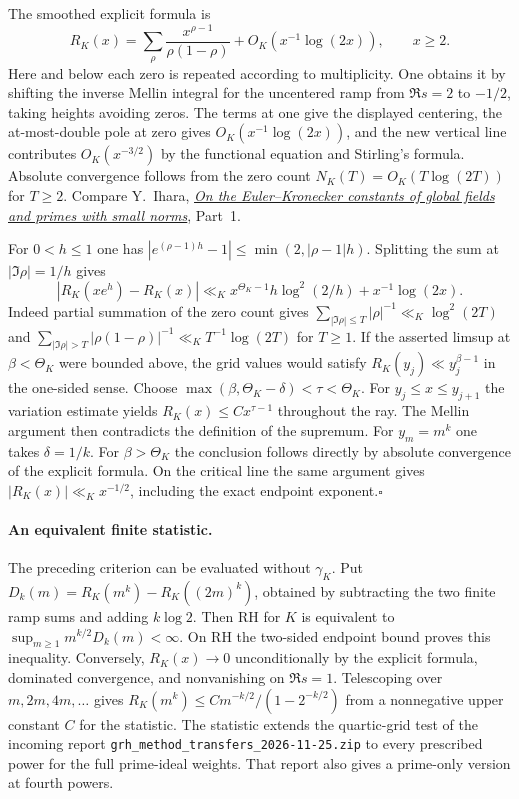 The smoothed explicit formula is
\[
 R_K(x)=\sum_\rho\frac{x^{\rho-1}}{\rho(1-\rho)}
             +O_K(x^{-1}\log(2x)),\qquad x\ge2 .
\]
Here and below each zero is repeated according to multiplicity.
One obtains it by shifting the inverse Mellin integral for the uncentered
ramp from $\Re s=2$ to $-1/2$, taking heights avoiding zeros. The terms
at one give the displayed centering, the at-most-double pole at zero gives
$O_K(x^{-1}\log(2x))$, and the new vertical line contributes
$O_K(x^{-3/2})$ by the functional equation and Stirling's formula.
Absolute convergence follows from the zero count $N_K(T)=O_K(T\log(2T))$
for $T\ge2$. Compare Y.~Ihara,
\href{https://www.kurims.kyoto-u.ac.jp/~kenkyubu/emeritus/ihara/Publications-and-Recent-Preprints/RecentArticles/pdf-files/1A.pdf}
{\emph{On the Euler--Kronecker constants of global fields and primes with small norms}}, Part~1.

For $0<h\le1$ one has $|e^{(\rho-1)h}-1|\le\min(2,|\rho-1|h)$.
Splitting the sum at $|\Im\rho|=1/h$ gives
\[
 |R_K(xe^h)-R_K(x)|\ll_K
 x^{\Theta_K-1}h\log^2(2/h)+x^{-1}\log(2x).
\]
Indeed partial summation of the zero count gives
$\sum_{|\Im\rho|\le T}|\rho|^{-1}\ll_K\log^2(2T)$ and
$\sum_{|\Im\rho|>T}|\rho(1-\rho)|^{-1}\ll_K T^{-1}\log(2T)$ for $T\ge1$.
If the asserted limsup at $\beta<\Theta_K$ were bounded above,
the grid values would satisfy $R_K(y_j)\ll y_j^{\beta-1}$ in the one-sided
sense. Choose $\max(\beta,\Theta_K-\delta)<\tau<\Theta_K$.
For $y_j\le x\le y_{j+1}$ the variation estimate yields
$R_K(x)\le Cx^{\tau-1}$ throughout the ray. The Mellin argument then
contradicts the definition of the supremum. For $y_m=m^k$ one takes
$\delta=1/k$. For $\beta>\Theta_K$ the conclusion follows directly by
absolute convergence of the explicit formula. On the critical line the same argument gives $|R_K(x)|\ll_K x^{-1/2}$, including the exact endpoint exponent.\hfill$\square$

\paragraph{An equivalent finite statistic.}
The preceding criterion can be evaluated without $\gamma_K$. Put
$D_k(m)=R_K(m^k)-R_K((2m)^k)$, obtained by subtracting the two finite ramp sums and adding $k\log2$. Then RH for $K$ is equivalent to $\sup_{m\ge1}m^{k/2}D_k(m)<\infty$. On RH the two-sided endpoint bound proves this inequality. Conversely, $R_K(x)\to0$ unconditionally by the explicit formula, dominated convergence, and nonvanishing on $\Re s=1$. Telescoping over $m,2m,4m,\ldots$ gives $R_K(m^k)\le C m^{-k/2}/(1-2^{-k/2})$ from a nonnegative upper constant $C$ for the statistic. The statistic extends the quartic-grid test of the incoming report \texttt{grh\_method\_transfers\_2026-11-25.zip} to every prescribed power for the full prime-ideal weights. That report also gives a prime-only version at fourth powers.

